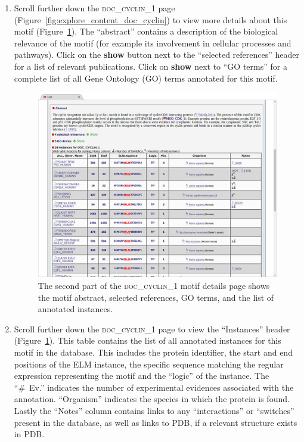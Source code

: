 \documentclass[12pt]{article}
\newcommand\button[1]{%
	\textbf{#1}%
}
\newcommand\motif[1]{%
    \textsc{\lowercase{#1}}%
}
\begin{document}
\begin{enumerate}
\item Scroll further down the \motif{DOC\_CYCLIN\_1} page
	(Figure~\ref{fig:explore_content_doc_cyclin}) to view
	more details about this motif
	(Figure~\ref{fig:explore_content_doc_cyclin_1_abstract_instances}).
    The ``abstract'' contains a description of the biological relevance of the
    motif (for example its involvement in cellular processes and pathways).
    Click on the \button{show} button next to the ``selected
	references'' header for a list of relevant publications.
	Click on \button{show} next to ``GO terms'' for a complete list of all
	Gene Ontology (GO) terms annotated for this motif.

\begin{figure}[h!]
	\centering
	\includegraphics[width=\textwidth]{Figures/explore_content/doc_cyclin_1_abstract_instances.png}
	\caption{
		The second part of the \motif{DOC\_CYCLIN\_1} motif details page
		shows the motif abstract, selected references, GO terms, and the list of annotated
		instances.
	}
	\label{fig:explore_content_doc_cyclin_1_abstract_instances}
\end{figure}

\item Scroll further down the \motif{DOC\_CYCLIN\_1} page to view
	the ``Instances'' header
	(Figure~\ref{fig:explore_content_doc_cyclin_1_abstract_instances}).
	This table contains the list of all annotated
	instances for this motif in the database. This includes the protein
	identifier, the start and end positions of the ELM instance, the specific
	sequence matching the regular expression representing the motif and
	the ``logic'' of the instance.
	The ``\#~Ev.'' indicates the number of experimental evidences
	associated with the annotation. ``Organism'' indicates the
	species in which the protein is found. Lastly the ``Notes'' column
	contains links to any ``interactions'' or ``switches'' present in the
	database, as well as links to PDB, if a relevant structure exists in PDB.
	

\end{enumerate}
\end{document}
